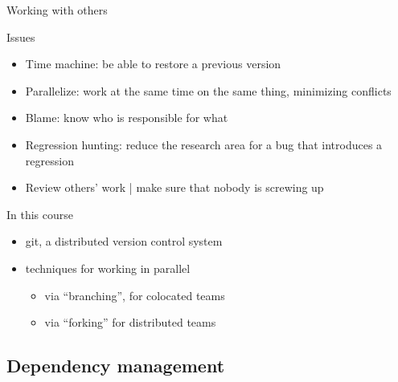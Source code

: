 \documentclass[presentation]{beamer}
\begin{document}
\begin{frame}{Working with others}
    \begin{block}{Issues}
        \begin{itemize}
            \item Time machine: be able to restore a previous version
            \item Parallelize: work at the same time on the same thing, minimizing conflicts
            \item Blame: know who is responsible for what
            \item Regression hunting: reduce the research area for a bug that introduces a regression
            \item Review others' work | make sure that nobody is screwing up
        \end{itemize}
    \end{block}
    \begin{block}{In this course}
        \begin{itemize}
            \item git, a distributed version control system
            \item techniques for working in parallel
            \begin{itemize}
                \item via ``branching'', for colocated teams
                \item via ``forking'' for distributed teams
            \end{itemize}
        \end{itemize}
    \end{block}
\end{frame}

\subsection{Dependency management}
\end{document}
